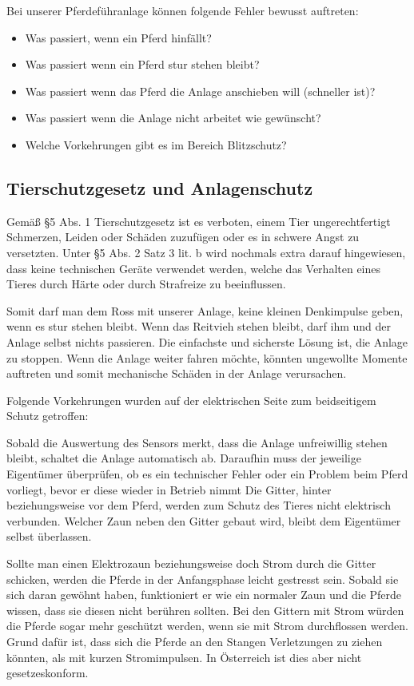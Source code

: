 \documentclass[12pt]{scrreprt} %
\begin{document}
Bei unserer Pferdeführanlage können folgende Fehler bewusst auftreten:

\begin{itemize}
\item{Was passiert, wenn ein Pferd hinfällt?}
\item{Was passiert wenn ein Pferd stur stehen bleibt?}
\item{Was passiert wenn das Pferd die Anlage anschieben will (schneller ist)?}
\item{Was passiert wenn die Anlage nicht arbeitet wie gewünscht?}
\item{Welche Vorkehrungen gibt es im Bereich Blitzschutz?}
\end{itemize}

\subsection{Tierschutzgesetz und Anlagenschutz}
\label{sec:tierschutzgesetzUndAnlagenschutz}

Gemäß §5 Abs. 1 Tierschutzgesetz ist es verboten, 
einem Tier ungerechtfertigt Schmerzen, Leiden oder Schäden zuzufügen oder es in schwere Angst zu versetzten. 
Unter §5 Abs. 2 Satz 3 lit. b wird nochmals extra darauf hingewiesen, dass keine technischen Geräte verwendet werden, welche das Verhalten eines Tieres durch Härte oder durch Strafreize zu beeinflussen. 

Somit darf man dem Ross mit unserer Anlage, keine kleinen Denkimpulse geben, wenn es stur stehen bleibt. Wenn das Reitvieh stehen bleibt, darf ihm und der Anlage selbst nichts passieren. Die einfachste und sicherste Lösung ist, die Anlage zu stoppen. Wenn die Anlage weiter fahren möchte, könnten ungewollte Momente auftreten und somit mechanische Schäden in der Anlage verursachen.

Folgende Vorkehrungen wurden auf der elektrischen Seite zum beidseitigem Schutz getroffen:

Sobald die Auswertung des Sensors merkt, dass die Anlage unfreiwillig stehen bleibt, schaltet die Anlage automatisch ab. Daraufhin muss der jeweilige Eigentümer überprüfen, ob es ein technischer Fehler oder ein Problem beim Pferd vorliegt, bevor er diese wieder in Betrieb nimmt
Die Gitter, hinter beziehungsweise vor dem Pferd, werden zum Schutz des Tieres nicht elektrisch verbunden.
Welcher Zaun neben den Gitter gebaut wird, bleibt dem Eigentümer selbst überlassen.

Sollte man einen Elektrozaun beziehungsweise doch Strom durch die Gitter schicken, werden die Pferde in der Anfangsphase leicht gestresst sein. Sobald sie sich daran gewöhnt haben, funktioniert er wie ein normaler Zaun und die Pferde wissen, dass sie diesen nicht berühren sollten.
Bei den Gittern mit Strom würden die Pferde sogar mehr geschützt werden, wenn sie mit Strom durchflossen werden. Grund dafür ist, dass sich die Pferde an den Stangen Verletzungen zu ziehen könnten, als mit kurzen Stromimpulsen. In Österreich ist dies aber nicht gesetzeskonform.
\end{document}
